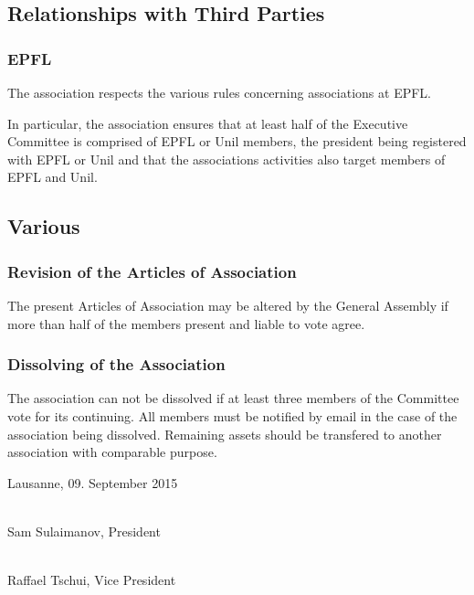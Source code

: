\documentclass[12pt,a4paper,oneside]{article}
\newcounter{art}
\newcommand{\english}{    \switchcolumn[0]\noindent}
\begin{document}
\begin{paracol}{2}
\english
	\subsection{Relationships with Third Parties}

	\subsubsection{EPFL}
	The association respects the various rules concerning associations at EPFL.

	In particular, the association ensures that at least half of the Executive Committee is comprised of EPFL or Unil members, the president being registered with EPFL or Unil and that the associations activities also target members of EPFL and Unil. 




\english
	\subsection{Various}

	\english
	\subsubsection{Revision of the Articles of Association}\stepcounter{art}
	The present Articles of Association may be altered by the General Assembly if more than half of the members present and liable to vote agree. 

	\english
	\subsubsection{Dissolving of the Association}\stepcounter{art}
	The association can not be dissolved if at least three members of the Committee vote for its continuing.
	All members must be notified by email in the case of the association being dissolved.
	Remaining assets should be transfered to another association with comparable purpose.


\english
	\vspace{\fill}
	
	\noindent
	Lausanne, 09. September 2015
	\vspace {1.5cm}

	\noindent
	\hrulefill \\
	Sam Sulaimanov, President

	\vspace {1.0cm}
 	\noindent 
 	\hrulefill \\
 	Raffael Tschui, Vice President
	

 	

	
	

\clearpage





\end{paracol}
\end{document}
